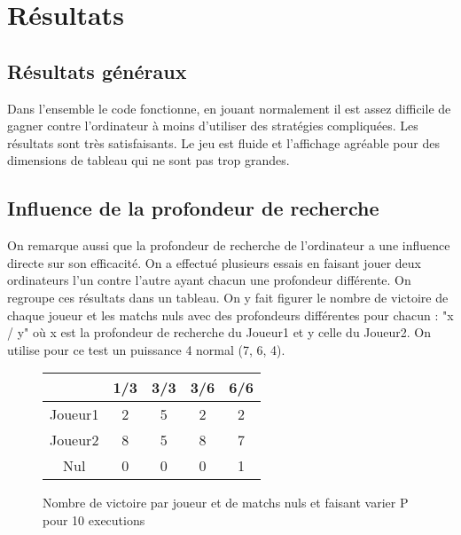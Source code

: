 \documentclass[a4paper, 10pt, french]{article}
\begin{document}
\section{Résultats}
{

    \subsection{Résultats généraux}
    {
        Dans l'ensemble le code fonctionne, en jouant normalement il est assez difficile de gagner contre l'ordinateur à moins
        d'utiliser des stratégies compliquées. Les résultats sont très satisfaisants. Le jeu est fluide et l'affichage agréable
        pour des dimensions de tableau qui ne sont pas trop grandes.
    }

    \subsection{Influence de la profondeur de recherche}
    {
        On remarque aussi que la profondeur de recherche de l'ordinateur a une influence directe sur son efficacité. On a effectué
        plusieurs essais en faisant jouer deux ordinateurs l'un contre l'autre ayant chacun une profondeur différente. On regroupe
        ces résultats dans un tableau. On y fait figurer le nombre de victoire de chaque joueur et les matchs nuls avec des
        profondeurs différentes pour chacun : "x / y" où x est la profondeur de recherche du Joueur1 et y celle du Joueur2.
        On utilise pour ce test un puissance 4 normal (7, 6, 4).

        \begin{figure}[h]
            \begin{center}
                \begin{tabular}{|c|c|c|c|c|}
                    \hline
                            &1/3&3/3&3/6&6/6\\
                    \hline
                    \hline
                    Joueur1 & 2 & 5 & 2 & 2 \\
                    \hline
                    Joueur2 & 8 & 5 & 8 & 7 \\
                    \hline
                    Nul     & 0 & 0 & 0 & 1 \\
                    \hline
                    \hline
                \end{tabular}
                \caption{Nombre de victoire par joueur et de matchs nuls et faisant varier P pour 10 executions}
                \label{table-temps}
            \end{center}
        \end{figure}

}}
\end{document}
